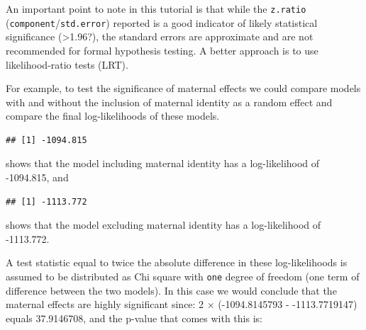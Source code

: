 \documentclass[
  12pt,
]{book}
\newenvironment{Shaded}{\begin{snugshade}}{\end{snugshade}}
\newcommand{\DecValTok}[1]{\textcolor[rgb]{0.00,0.00,0.81}{#1}}
\newcommand{\FunctionTok}[1]{\textcolor[rgb]{0.00,0.00,0.00}{#1}}
\newcommand{\NormalTok}[1]{#1}
\newcommand{\SpecialCharTok}[1]{\textcolor[rgb]{0.00,0.00,0.00}{#1}}
\begin{document}
An important point to note in this tutorial is that while the \texttt{z.ratio} (\texttt{component}/\texttt{std.error}) reported is a good indicator of likely statistical significance (\textgreater1.96?), the standard errors are approximate and are not recommended for formal hypothesis testing. A better approach is to use likelihood-ratio tests (LRT).

For example, to test the significance of maternal effects we could compare models with and without the inclusion of maternal identity as a random effect and compare the final log-likelihoods of these models.

\begin{Shaded}
\end{Shaded}

\begin{verbatim}
## [1] -1094.815
\end{verbatim}

shows that the model including maternal identity has a log-likelihood of -1094.815, and

\begin{Shaded}
\end{Shaded}

\begin{verbatim}
## [1] -1113.772
\end{verbatim}

shows that the model excluding maternal identity has a log-likelihood of -1113.772.

A test statistic equal to twice the absolute difference in these log-likelihoods is assumed to be distributed as Chi square with \texttt{one} degree of freedom (one term of difference between the two models). In this case we would conclude that the maternal effects are highly significant since:
2 \(\times\) (-1094.8145793 - -1113.7719147) equals 37.9146708, and the p-value that comes with this is:

\begin{Shaded}
\end{Shaded}
\end{document}
